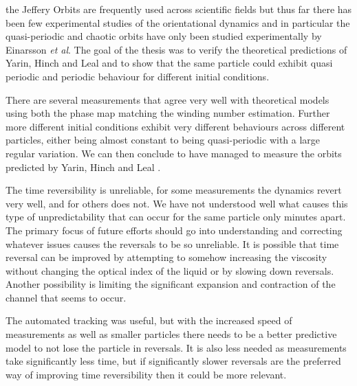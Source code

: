 the Jeffery Orbits are frequently used across scientific fields but thus far there has been few experimental studies 
of the orientational dynamics and in particular the quasi-periodic and chaotic orbits have only been studied experimentally
by Einarsson \emph{et al}\cite{JonasExperiment}\cite{Mishra}.
The goal of the thesis was to verify the theoretical predictions of Yarin, Hinch and Leal \cite{Yarin, Leal} and to show that the same particle could exhibit quasi periodic and periodic behaviour for different initial conditions.

There are several measurements that agree very well with theoretical models using both the phase map matching the winding number estimation. Further more different initial conditions exhibit very different behaviours across different particles, 
either being almost constant to being quasi-periodic with a large regular variation. We can then conclude to have managed to measure the
orbits predicted by Yarin, Hinch and Leal \cite{Yarin, Leal}.

The time reversibility is unreliable, for some measurements the dynamics revert very well, and for others does not. 
We have not understood well what causes this type of unpredictability that can occur for the same particle only 
minutes apart. The primary focus of future efforts should go into understanding and correcting whatever issues causes the 
reversals to be so unreliable. It is possible that time reversal can be improved by attempting to somehow increasing the viscosity 
without changing the optical index of the liquid or by slowing down reversals. Another possibility is limiting the 
significant expansion and contraction of the channel that seems to occur.

The automated tracking was useful, but with the increased speed of measurements as well as smaller particles 
there needs to be a better predictive model to not lose the particle in reversals. It is also less needed as 
measurements take significantly less time, but if significantly slower reversals are the preferred way of improving 
time reversibility then it could be more relevant. 